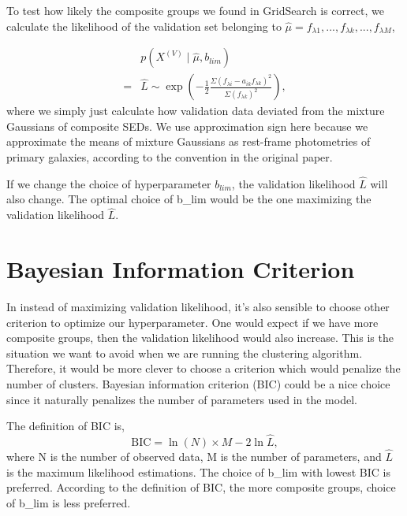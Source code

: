 \documentclass[12pt,letterpaper]{article}
\begin{document}
To test how likely the composite groups we found in GridSearch is correct, we calculate the likelihood of the validation set belonging to $\hat \mu = f_{\lambda 1}, ..., f_{\lambda k}, ..., f_{\lambda M}$,

\begin{equation}
    \begin{split}
        &p(X^{(V)} \mid \hat \mu, b_{lim}) \\ 
        = &\hat L \sim \exp{\left( - \frac{1}{2} \frac{ \Sigma (f_{\lambda i} - a_{ik} f_{\lambda k} )^2 }{\Sigma (f_{\lambda k})^2} \right)},   
    \end{split}
    \label{eq:likelihood}
\end{equation}
where we simply just calculate how validation data deviated from the mixture Gaussians of composite SEDs.
We use approximation sign here because we approximate the means of mixture Gaussians as rest-frame photometries of primary galaxies, according to the convention in the original paper.

If we change the choice of hyperparameter $b_{lim}$, the validation likelihood $\hat L$ will also change.
The optimal choice of b\_lim would be the one maximizing the validation likelihood $\hat L$.


\section*{Bayesian Information Criterion}
In instead of maximizing validation likelihood, it's also sensible to choose other criterion to optimize our hyperparameter.
One would expect if we have more composite groups, then the validation likelihood would also increase.
This is the situation we want to avoid when we are running the clustering algorithm.
Therefore, it would be more clever to choose a criterion which would penalize the number of clusters.
Bayesian information criterion (BIC) could be a nice choice since it naturally penalizes the number of parameters used in the model.

The definition of BIC is,
\begin{equation}
    \mathrm{BIC} = \ln{(N)} \times M - 2\ln{\hat L},
\end{equation}
where N is the number of observed data, M is the number of parameters, and $\hat L$ is the maximum likelihood estimations.
The choice of b\_lim with lowest BIC is preferred. 
According to the definition of BIC, the more composite groups, choice of b\_lim is less preferred.
\end{document}
